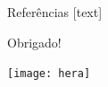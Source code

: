\documentclass{beamer}
\begin{document}
  \begin{frame}[allowframebreaks]{Referências}
    [text]
    
    
  \end{frame}


  \begin{frame}
    \begin{center}
      Obrigado!
      \begin{center}
        \texttt{[image: hera]}
      \end{center}
    \end{center}
  \end{frame}
\end{document}
